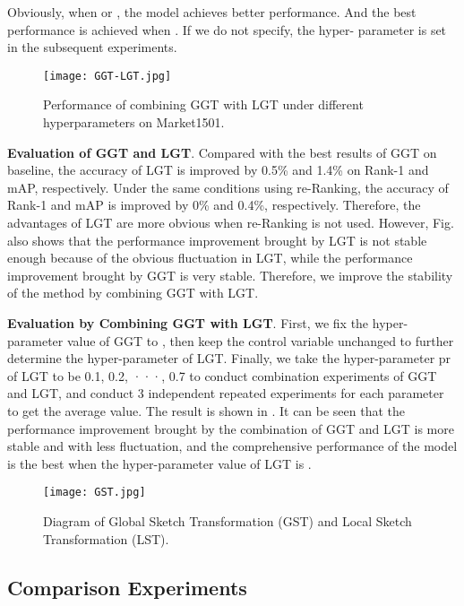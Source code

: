 \documentclass[10pt,twocolumn,letterpaper]{article}
\begin{document}
Obviously, when  or , the model achieves better performance. And the best performance is achieved when . If we do not specify, the hyper- parameter is set  in the subsequent experiments.



\begin{figure}[t]
	\setlength{\abovecaptionskip}{0.1cm}
	\setlength{\belowcaptionskip}{-0.4cm}   \centering
	\texttt{[image: GGT-LGT.jpg]}
	\caption{Performance of combining GGT with LGT under different hyperparameters on Market1501.}
\end{figure}

\textbf{Evaluation of GGT and LGT}. Compared with the best results of GGT on baseline\cite{zheng2018discriminatively}, the accuracy of LGT is improved by 0.5\% and 1.4\% on Rank-1 and mAP, respectively. Under the same conditions using re-Ranking\cite{re_ranking}, the accuracy of Rank-1 and mAP is improved by 0\% and 0.4\%, respectively. Therefore, the advantages of LGT are more obvious when re-Ranking is not used. However, Fig. also shows that the performance improvement brought by LGT is not stable enough because of the obvious fluctuation in LGT, while the performance improvement brought by GGT is very stable. Therefore, we improve the stability of the method by combining GGT with LGT.

\textbf{Evaluation by Combining GGT with LGT}. First, we fix the hyper-parameter value of GGT to , then keep the control variable unchanged to further determine the hyper-parameter of LGT. Finally, we take the hyper-parameter pr of LGT to be 0.1, 0.2, ···, 0.7 to conduct combination experiments of GGT and LGT, and conduct 3 independent repeated experiments for each parameter  to get the average value. The result is shown in . It can be seen that the performance improvement brought by the combination of GGT and LGT is more stable and with less fluctuation, and the comprehensive performance of the model is the best when the hyper-parameter value of LGT is .


\begin{figure}[t]
	\setlength{\abovecaptionskip}{0.1cm}
	\setlength{\belowcaptionskip}{-0.4cm}   \centering
	\texttt{[image: GST.jpg]}
	\caption{Diagram of Global Sketch Transformation (GST) and Local Sketch Transformation (LST).}
\end{figure}

\subsection{Comparison Experiments}
\end{document}
